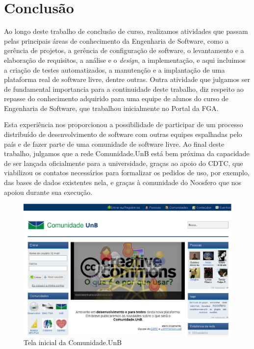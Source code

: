 \chapter{Conclusão}
\label{cap:conclusao}

Ao longo deste trabalho de conclusão de curso, realizamos atividades que passam
pelas principais áreas de conhecimento da Engenharia de Software, como a
gerência de projetos, a gerência de configuração de software,
o levantamento e a elaboração de requisitos, a análise e o \textit{design},
a implementação, e aqui incluimos a criação de testes automatizados,
a manutenção e a implantação de uma plataforma real de software livre, dentre
outras.
%
Outra atividade que julgamos ser de fundamental importancia para a continuidade
deste trabalho, diz respeito ao repasse do conhecimento adquirido para uma
equipe de alunos do curso de Engenharia de Software, que trabalhou inicialmente
no Portal da FGA.

Esta experiência nos proporcionou a possibilidade de participar de um processo
distribuído de desenvolvimento de software com outras equipes espalhadas pelo
país e de fazer parte de uma comunidade de software livre.
%
Ao final deste trabalho, julgamos que a rede Comunidade.UnB está bem próxima
da capacidade de ser lançada oficialmente para a universidade, graças ao
apoio do CDTC, que viabilizou os contatos necessários para formalizar os
pedidos de uso, por exemplo, das bases de dados existentes nela, e graças
à comunidade do Noosfero que nos apoiou durante sua execução.

\begin{figure}[h!]
	\centering
	\includegraphics[keepaspectratio=true,scale=0.45]
	  {figuras/comunidade-unb.eps}
	\caption{Tela inicial da Comunidade.UnB}
	\label{homepage:comunidade.unb}
\end{figure}

